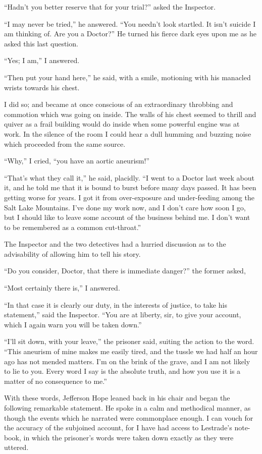 \documentclass[12pt]{book}
\begin{document}
“Hadn’t you better reserve that for your trial?” asked the Inspector. 

“I may never be tried,” he answered. “You needn’t look startled. It isn’t suicide I am thinking of. Are you a Doctor?” He turned his fierce dark eyes upon me as he asked this last question. 

“Yes; I am,” I answered. 

“Then put your hand here,” he said, with a smile, motioning with his manacled wrists towards his chest. 

I did so; and became at once conscious of an extraordinary throbbing and commotion which was going on inside. The walls of his chest seemed to thrill and quiver as a frail building would do inside when some powerful engine was at work. In the silence of the room I could hear a dull humming and buzzing noise which proceeded from the same source. 

“Why,” I cried, “you have an aortic aneurism!” 

“That’s what they call it,” he said, placidly. “I went to a Doctor last week about it, and he told me that it is bound to burst before many days passed. It has been getting worse for years. I got it from over-exposure and under-feeding among the Salt Lake Mountains. I’ve done my work now, and I don’t care how soon I go, but I should like to leave some account of the business behind me. I don’t want to be remembered as a common cut-throat.” 

The Inspector and the two detectives had a hurried discussion as to the advisability of allowing him to tell his story. 

“Do you consider, Doctor, that there is immediate danger?” the former asked,

“Most certainly there is,” I answered. 

“In that case it is clearly our duty, in the interests of justice, to take his statement,” said the Inspector. “You are at liberty, sir, to give your account, which I again warn you will be taken down.” 

“I’ll sit down, with your leave,” the prisoner said, suiting the action to the word. “This aneurism of mine makes me easily tired, and the tussle we had half an hour ago has not mended matters. I’m on the brink of the grave, and I am not likely to lie to you. Every word I say is the absolute truth, and how you use it is a matter of no consequence to me.” 

With these words, Jefferson Hope leaned back in his chair and began the following remarkable statement. He spoke in a calm and methodical manner, as though the events which he narrated were commonplace enough. I can vouch for the accuracy of the subjoined account, for I have had access to Lestrade’s note-book, in which the prisoner’s words were taken down exactly as they were uttered. 
\end{document}
